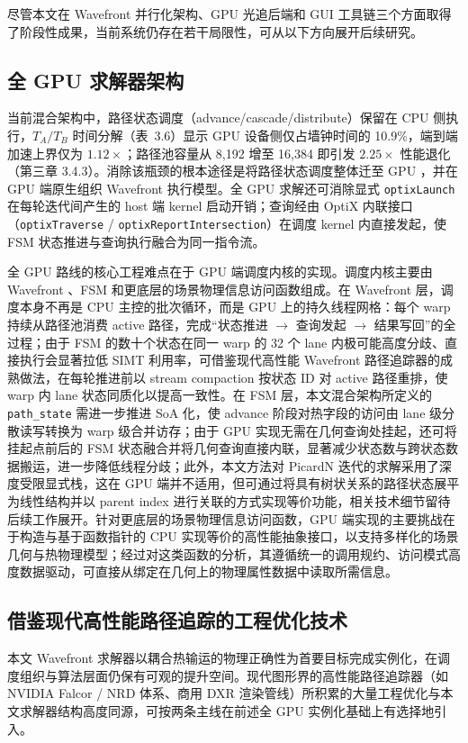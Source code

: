 尽管本文在 Wavefront 并行化架构、GPU 光追后端和 GUI 工具链三个方面取得了阶段性成果，当前系统仍存在若干局限性，可从以下方向展开后续研究。

\subsection{ 全 GPU 求解器架构 }当前混合架构中，路径状态调度（advance/cascade/distribute）保留在 CPU 侧执行，$T_A/T_B$ 时间分解（表~3.6）显示 GPU 设备侧仅占墙钟时间的 10.9\%，端到端加速上界仅为 $1.12\times$；路径池容量从 8{,}192 增至 16{,}384 即引发 $2.25\times$ 性能退化（第三章 3.4.3）。消除该瓶颈的根本途径是将路径状态调度整体迁至 GPU ，并在 GPU 端原生组织 Wavefront 执行模型。全 GPU 求解还可消除显式 \texttt{optixLaunch} 在每轮迭代间产生的 host 端 kernel 启动开销；查询经由 OptiX 内联接口（\texttt{optixTraverse} / \texttt{optixReportIntersection}）在调度 kernel 内直接发起，使 FSM 状态推进与查询执行融合为同一指令流。

全 GPU 路线的核心工程难点在于 GPU 端调度内核的实现。调度内核主要由 Wavefront 、FSM 和更底层的场景物理信息访问函数组成。在 Wavefront 层，调度本身不再是 CPU 主控的批次循环，而是 GPU 上的持久线程网格：每个 warp 持续从路径池消费 active 路径，完成“状态推进 $\to$ 查询发起 $\to$ 结果写回”的全过程；由于 FSM 的数十个状态在同一 warp 的 32 个 lane 内极可能高度分歧、直接执行会显著拉低 SIMT 利用率，可借鉴现代高性能 Wavefront 路径追踪器的成熟做法，在每轮推进前以 stream compaction 按状态 ID 对 active 路径重排，使 warp 内 lane 状态同质化以提高一致性。在 FSM 层，本文混合架构所定义的 \texttt{path\_state} 需进一步推进 SoA 化，使 advance 阶段对热字段的访问由 lane 级分散读写转换为 warp 级合并访存；由于 GPU 实现无需在几何查询处挂起，还可将挂起点前后的 FSM 状态融合并将几何查询直接内联，显著减少状态数与跨状态数据搬运，进一步降低线程分歧；此外，本文方法对 PicardN 迭代的求解采用了深度受限显式栈，这在 GPU 端并不适用，但可通过将具有树状关系的路径状态展平为线性结构并以 parent index 进行关联的方式实现等价功能，相关技术细节留待后续工作展开。针对更底层的场景物理信息访问函数，GPU 端实现的主要挑战在于构造与基于函数指针的 CPU 实现等价的高性能抽象接口，以支持多样化的场景几何与热物理模型；经过对这类函数的分析，其遵循统一的调用规约、访问模式高度数据驱动，可直接从绑定在几何上的物理属性数据中读取所需信息。

\subsection{ 借鉴现代高性能路径追踪的工程优化技术 }本文 Wavefront 求解器以耦合热输运的物理正确性为首要目标完成实例化，在调度组织与算法层面仍保有可观的提升空间。现代图形界的高性能路径追踪器（如 NVIDIA Falcor / NRD 体系、商用 DXR 渲染管线）所积累的大量工程优化与本文求解器结构高度同源，可按两条主线在前述全 GPU 实例化基础上有选择地引入。

